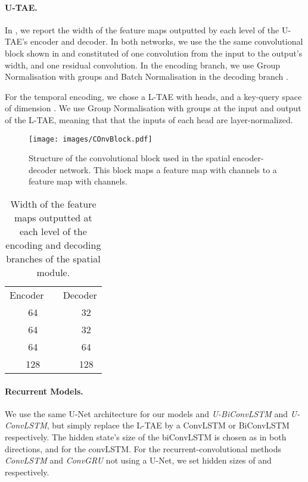 \paragraph{U-TAE.} 
In , we report the width of the feature maps outputted by each level of the U-TAE's encoder and decoder.
In both networks, we use the the same convolutional block shown in  and constituted of one  convolution from the input to the output's width, and one residual  convolution. In the encoding branch, we use Group Normalisation with  groups and Batch Normalisation in the decoding branch .

For the temporal encoding, we chose a L-TAE with  heads, and a key-query space of dimension . We use Group Normalisation with  groups at the input and output of the L-TAE, meaning that that the inputs of each head are layer-normalized.


\begin{figure}[h!]
    \centering
    \texttt{[image: images/COnvBlock.pdf]}
    \caption{Structure of the convolutional block used in the spatial encoder-decoder network. This block maps a feature map with  channels to a feature map with  channels. }
    \label{fig:convlblock}
\end{figure}


\begin{table}[]
    \centering
    \caption{Width of the feature maps outputted at each level of the encoding and decoding branches of the spatial module.}
    \begin{tabular}{ccccc}
      \multicolumn{2}{c}{Encoder}&\phantom{a}&\multicolumn{2}{c}{Decoder}\\\cmidrule{1-2}\cmidrule{4-5}
        & 64 &&  & 32 \\
         & 64 &&  & 32 \\
        & 64 &&  & 64 \\
        & 128 &&  & 128 \\
    \end{tabular}
    \label{tab:unet_conf}
\end{table}

\paragraph{Recurrent Models.} 
We use the same U-Net architecture for our models and \emph{U-BiConvLSTM} and \emph{U-ConvLSTM}, but simply replace the L-TAE by a ConvLSTM or BiConvLSTM respectively. The hidden state's size of the biConvLSTM is chosen as  in both directions, and  for the convLSTM.
For the recurrent-convolutional methods \emph{ConvLSTM} and \emph{ConvGRU} not using a U-Net, we set hidden sizes of  and  respectively. 


